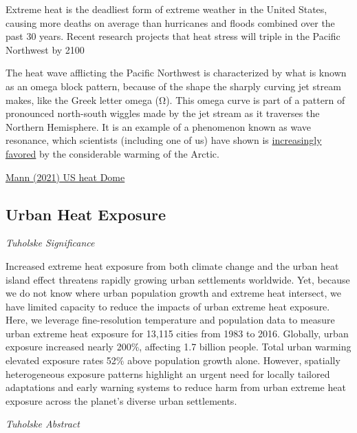 \documentclass[
]{book}
\begin{document}
Extreme heat is the deadliest form of extreme weather in the United States, causing more deaths on average than hurricanes and floods combined over the past 30 years. Recent research projects that heat stress will triple in the Pacific Northwest by 2100

The heat wave afflicting the Pacific Northwest is characterized by what is known as an omega block pattern, because of the shape the sharply curving jet stream makes, like the Greek letter omega (Ω). This omega curve is part of a pattern of pronounced north-south wiggles made by the jet stream as it traverses the Northern Hemisphere. It is an example of a phenomenon known as wave resonance, which scientists (including one of us) have shown is \href{https://news.psu.edu/story/545128/2018/10/31/research/controlling-future-summer-weather-extremes-still-within-our-grasp}{increasingly favored} by the considerable warming of the Arctic.

\href{https://www.nytimes.com/2021/06/29/opinion/heat-dome-climate-change.html}{Mann (2021) US heat Dome}

\hypertarget{urban-heat-exposure}{%
\subsection{Urban Heat Exposure}\label{urban-heat-exposure}}

\emph{Tuholske Significance}

Increased extreme heat exposure from both climate change and the urban heat island effect threatens rapidly growing urban settlements worldwide. Yet, because we do not know where urban population growth and extreme heat intersect, we have limited capacity to reduce the impacts of urban extreme heat exposure. Here, we leverage fine-resolution temperature and population data to measure urban extreme heat exposure for 13,115 cities from 1983 to 2016. Globally, urban exposure increased nearly 200\%, affecting 1.7 billion people. Total urban warming elevated exposure rates 52\% above population growth alone. However, spatially heterogeneous exposure patterns highlight an urgent need for locally tailored adaptations and early warning systems to reduce harm from urban extreme heat exposure across the planet's diverse urban settlements.

\emph{Tuholske Abstract}
\end{document}
